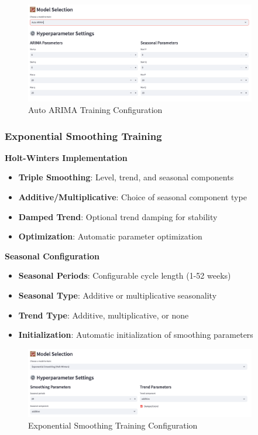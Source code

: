 \begin{figure}[H]
	\centering
	\includegraphics[width=0.9\textwidth]{Images/05ApplicationFunctionsAndFeatures/ARIMATraining.png}
	\caption{Auto ARIMA Training Configuration}
	\label{fig:arima_training}
\end{figure}

\subsubsection{Exponential Smoothing Training}

\textbf{Holt-Winters Implementation}
\begin{itemize}
	\item \textbf{Triple Smoothing}: Level, trend, and seasonal components
	\item \textbf{Additive/Multiplicative}: Choice of seasonal component type
	\item \textbf{Damped Trend}: Optional trend damping for stability
	\item \textbf{Optimization}: Automatic parameter optimization
\end{itemize}

\textbf{Seasonal Configuration}
\begin{itemize}
	\item \textbf{Seasonal Periods}: Configurable cycle length (1-52 weeks)
	\item \textbf{Seasonal Type}: Additive or multiplicative seasonality
	\item \textbf{Trend Type}: Additive, multiplicative, or none
	\item \textbf{Initialization}: Automatic initialization of smoothing parameters
\end{itemize}

\begin{figure}[H]
	\centering
	\includegraphics[width=0.9\textwidth]{Images/05ApplicationFunctionsAndFeatures/ExponentialSmoothingTraining.png}
	\caption{Exponential Smoothing Training Configuration}
	\label{fig:exponential_smoothing_training}
\end{figure}

